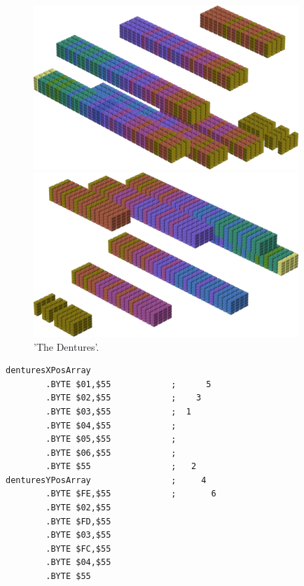 \clearpage
\begin{figure}[H]
    \centering
    \begin{adjustbox}{width=10cm,center}
      \includegraphics[width=10cm]{src/colorspace_patterns/pattern2-45.png}%
    \end{adjustbox}
    \begin{adjustbox}{width=10cm}
      \includegraphics[width=10cm]{src/colorspace_patterns/pattern2-225.png}%
    \end{adjustbox}
\caption{'The Dentures'.}
\end{figure}
\clearpage

\begin{lstlisting}
denturesXPosArray
        .BYTE $01,$55            ;      5 
        .BYTE $02,$55            ;    3   
        .BYTE $03,$55            ;  1     
        .BYTE $04,$55            ;        
        .BYTE $05,$55            ;        
        .BYTE $06,$55            ;        
        .BYTE $55                ;   2    
denturesYPosArray                ;     4  
        .BYTE $FE,$55            ;       6
        .BYTE $02,$55
        .BYTE $FD,$55
        .BYTE $03,$55
        .BYTE $FC,$55
        .BYTE $04,$55
        .BYTE $55

\end{lstlisting}

\clearpage

